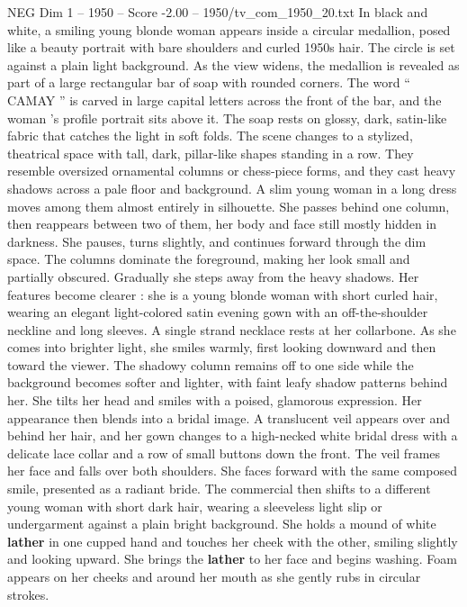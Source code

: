\begin{textsample}{NEG Dim 1 – 1950 – Score -2.00 – 1950/tv\_com\_1950\_20.txt}  \label{ex:f1_neg_016}
In black and white, a smiling young blonde woman appears inside a circular medallion, posed like a beauty portrait with bare shoulders and curled 1950s hair.
The circle is set against a plain light background.
As the view widens, the medallion is revealed as part of a large rectangular bar of soap with rounded corners.
The word “ CAMAY ” is carved in large capital letters across the front of the bar, and the woman ’s profile portrait sits above it.
The soap rests on glossy, dark, satin-like fabric that catches the light in soft folds.
The scene changes to a stylized, theatrical space with tall, dark, pillar-like shapes standing in a row.
They resemble oversized ornamental columns or chess-piece forms, and they cast heavy shadows across a pale floor and background.
A slim young woman in a long dress moves among them almost entirely in silhouette.
She passes behind one column, then reappears between two of them, her body and face still mostly hidden in darkness.
She pauses, turns slightly, and continues forward through the dim space.
The columns dominate the foreground, making her look small and partially obscured.
Gradually she steps away from the heavy shadows.
Her features become clearer : she is a young blonde woman with short curled hair, wearing an elegant light-colored satin evening gown with an off-the-shoulder neckline and long sleeves.
A single strand necklace rests at her collarbone.
As she comes into brighter light, she smiles warmly, first looking downward and then toward the viewer.
The shadowy column remains off to one side while the background becomes softer and lighter, with faint leafy shadow patterns behind her.
She tilts her head and smiles with a poised, glamorous expression.
Her appearance then blends into a bridal image.
A translucent veil appears over and behind her hair, and her gown changes to a high-necked white bridal dress with a delicate lace collar and a row of small buttons down the front.
The veil frames her face and falls over both shoulders.
She faces forward with the same composed smile, presented as a radiant bride.
The commercial then shifts to a different young woman with short dark hair, wearing a sleeveless light slip or undergarment against a plain bright background.
She holds a mound of white \textbf{lather} in one cupped hand and touches her cheek with the other, smiling slightly and looking upward.
She brings the \textbf{lather} to her face and begins washing.
Foam appears on her cheeks and around her mouth as she gently rubs in circular strokes.

\end{textsample}
